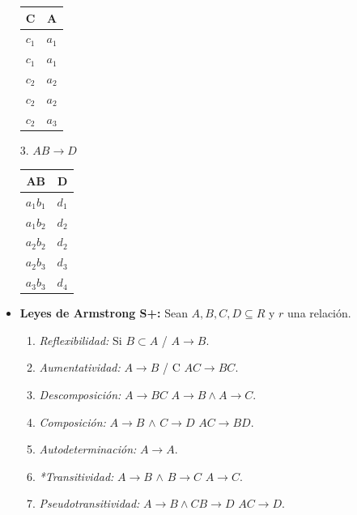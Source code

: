 \documentclass{templateNote}
\begin{document}
\begin{itemize}
\begin{center}
\begin{minipage}{0.3\textwidth}
            \centering
            \begin{tabular}{|c|c|}
                \hline
                \textbf{C} & \textbf{A} \\ \hline
                $c_1$ & $a_1$ \\ \hline
                $c_1$ & $a_1$ \\ \hline
                \rowcolor{red!20!white} $c_2$ & $a_2$ \\ \hline
                \rowcolor{red!20!white} $c_2$ & $a_2$ \\ \hline
                \rowcolor{red!20!white} $c_2$ & $a_3$ \\ \hline
            \end{tabular}
        \end{minipage}
        \begin{minipage}{0.3\textwidth}
            3. $AB \rightarrow D$
            \\

            \centering
            \begin{tabular}{|c|c|}
                \hline
                \textbf{AB} & \textbf{D} \\ \hline
                $a_1b_1$ & $d_1$ \\ \hline
                $a_1b_2$ & $d_2$ \\ \hline
                $a_2b_2$ & $d_2$ \\ \hline
                $a_2b_3$ & $d_3$ \\ \hline
                $a_3b_3$ & $d_4$ \\ \hline
            \end{tabular}
        \end{minipage}
    \end{center}

    
    \item \textbf{Leyes de Armstrong S+:} Sean $A,B,C,D \subseteq R$ y $r$ una relación.
    \begin{enumerate}
        \item \textit{Reflexibilidad:} Si $B \subset A$ / $A \rightarrow B$.
        \item \textit{Aumentatividad:} $A \rightarrow B$ / C \qquad $AC \rightarrow BC$.
        \item \textit{Descomposición:} $A \rightarrow BC$ \qquad $A \rightarrow B \wedge A \rightarrow C$.
        \item \textit{Composición:} $A \rightarrow B$ $\wedge$ $C \rightarrow D$ \qquad $AC \rightarrow BD$.
        \item \textit{Autodeterminación:} $A \rightarrow A$.
        \item \textit{*Transitividad:} $A \rightarrow B$ $\wedge$ $B \rightarrow C$ \qquad $A \rightarrow C$.
        \item \textit{Pseudotransitividad:} $A \rightarrow B \wedge CB \rightarrow D$ \qquad $AC \rightarrow D$.
    \end{enumerate}


\end{itemize}
\end{document}
